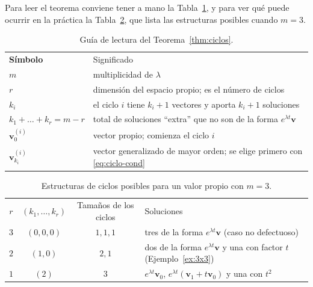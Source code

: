 Para leer el teorema conviene tener a mano la Tabla~\ref{tab:lectura-teorema}, y para ver qu\'e puede ocurrir en la pr\'actica la Tabla~\ref{tab:estructuras}, que lista las estructuras posibles cuando $m=3$.

\begin{table}[H]
\centering
\renewcommand{\arraystretch}{1.35}
\begin{tabular}{>{\bfseries}l l}
\rowcolor{bbe!15}
\textcolor{bbe}{S\'imbolo} & \textcolor{bbe}{Significado} \\
$m$ & multiplicidad de $\lambda$ \\
$r$ & dimensi\'on del espacio propio; es el n\'umero de ciclos \\
$k_i$ & el ciclo $i$ tiene $k_i+1$ vectores y aporta $k_i+1$ soluciones \\
$k_1+\dots+k_r=m-r$ & total de soluciones ``extra'' que no son de la forma $e^{\lambda t}\mathbf v$ \\
$\mathbf v_0^{(i)}$ & vector propio; comienza el ciclo $i$ \\
$\mathbf v_{k_i}^{(i)}$ & vector generalizado de mayor orden; se elige primero con \eqref{eq:ciclo-cond} \\
\end{tabular}
\caption{Gu\'ia de lectura del Teorema~\ref{thm:ciclos}.}
\label{tab:lectura-teorema}
\end{table}

\begin{table}[H]
\centering
\renewcommand{\arraystretch}{1.4}
\begin{tabular}{c c c l}
\rowcolor{bbe!15}
\textcolor{bbe}{$r$} & \textcolor{bbe}{$(k_1,\dots,k_r)$} & \textcolor{bbe}{Tama\~nos de los ciclos} & \textcolor{bbe}{Soluciones} \\
$3$ & $(0,0,0)$ & $1,1,1$ & tres de la forma $e^{\lambda t}\mathbf v$ (caso no defectuoso) \\
$2$ & $(1,0)$ & $2,1$ & dos de la forma $e^{\lambda t}\mathbf v$ y una con factor $t$ (Ejemplo~\ref{ex:3x3}) \\
$1$ & $(2)$ & $3$ & $e^{\lambda t}\mathbf v_0$, $e^{\lambda t}(\mathbf v_1+t\mathbf v_0)$ y una con $t^2$ \\
\end{tabular}
\caption{Estructuras de ciclos posibles para un valor propio con $m=3$.}
\label{tab:estructuras}
\end{table}

